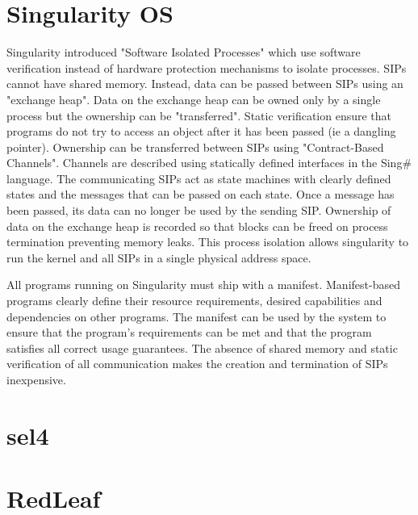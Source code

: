 
\section{Singularity OS}
Singularity\cite{singularity} introduced "Software Isolated Processes" which use software verification instead of hardware protection mechanisms to isolate processes. SIPs cannot have shared memory. Instead, data can be passed between SIPs using an "exchange heap". Data on the exchange heap can be owned only by a single process but the ownership can be "transferred". Static verification ensure that programs do not try to access an object after it has been passed (ie a dangling pointer). Ownership can be transferred between SIPs using "Contract-Based Channels". Channels are described using statically defined interfaces in the Sing# language. The communicating SIPs act as state machines with clearly defined states and the messages that can be passed on each state. Once a message has been passed, its data can no longer be used by the sending SIP. Ownership of data on the exchange heap is recorded so that blocks can be freed on process termination preventing memory leaks. This process isolation allows singularity to run the kernel and all SIPs in a single physical address space.

All programs running on Singularity must ship with a manifest. Manifest-based programs clearly define their resource requirements, desired capabilities and dependencies on other programs. The manifest can be used by the system to ensure that the program's requirements can be met and that the program satisfies all correct usage guarantees. The absence of shared memory and static verification of all communication makes the creation and termination of SIPs inexpensive.
\section{sel4}

\section{RedLeaf}

